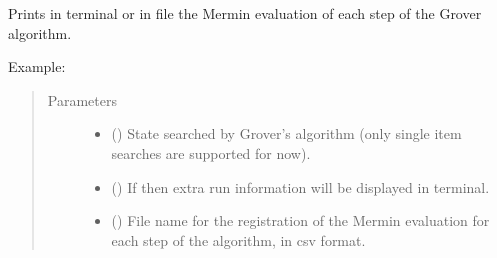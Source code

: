 \documentclass[letterpaper,10pt,english]{sphinxmanual}
\begin{document}

\begin{fulllineitems}
\label{\detokenize{grover:grover.grover}}
Prints in terminal or in file  the Mermin evaluation of each step 
of the Grover algorithm.
\begin{description}
\item[{Example:}] \leavevmode
{}%
\begin{sphinxVerbatim}[commandchars=\\\{\},formatcom=\footnotesize]
\end{sphinxVerbatim}

\end{description}
\begin{quote}\begin{description}
\item[{Parameters}] \leavevmode\begin{itemize}
\item {} 
 (\sphinxstyleliteralemphasis{\sphinxupquote{{[}}}\sphinxstyleliteralemphasis{\sphinxupquote{{]}}}) \textendash{} State searched by Grover’s algorithm 
(only single item searches are supported for now).

\item {} 
 () \textendash{} If  then extra run information will be 
displayed in terminal.

\item {} 
 () \textendash{} File name for the registration of the Mermin evaluation 
for each step of the algorithm, in csv format.


\end{itemize}
\end{description}
\end{quote}
\end{fulllineitems}
\end{document}
